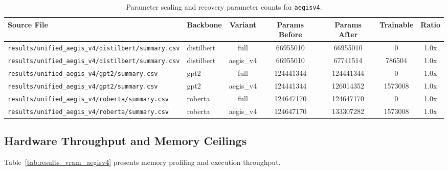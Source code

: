 \begin{table}[t]
\centering
\small
\begin{tabular}{llccccc}
\toprule
\textbf{Source File} & \textbf{Backbone} & \textbf{Variant} & \textbf{Params Before} & \textbf{Params After} & \textbf{Trainable} & \textbf{Ratio} \\
\midrule
\texttt{results/unified\_aegis\_v4/distilbert/summary.csv} & distilbert & full & 66955010 & 66955010 & 0 & 1.0x \\
\texttt{results/unified\_aegis\_v4/distilbert/summary.csv} & distilbert & aegis\_v4 & 66955010 & 67741514 & 786504 & 1.0x \\
\texttt{results/unified\_aegis\_v4/gpt2/summary.csv} & gpt2 & full & 124441344 & 124441344 & 0 & 1.0x \\
\texttt{results/unified\_aegis\_v4/gpt2/summary.csv} & gpt2 & aegis\_v4 & 124441344 & 126014352 & 1573008 & 1.0x \\
\texttt{results/unified\_aegis\_v4/roberta/summary.csv} & roberta & full & 124647170 & 124647170 & 0 & 1.0x \\
\texttt{results/unified\_aegis\_v4/roberta/summary.csv} & roberta & aegis\_v4 & 124647170 & 133307282 & 1573008 & 1.0x \\
\bottomrule
\end{tabular}
\caption{Parameter scaling and recovery parameter counts for \texttt{aegisv4}.}
\label{tab:results_params_aegisv4}
\end{table}

\subsection{Hardware Throughput and Memory Ceilings}
Table~\ref{tab:results_vram_aegisv4} presents memory profiling and execution throughput.


